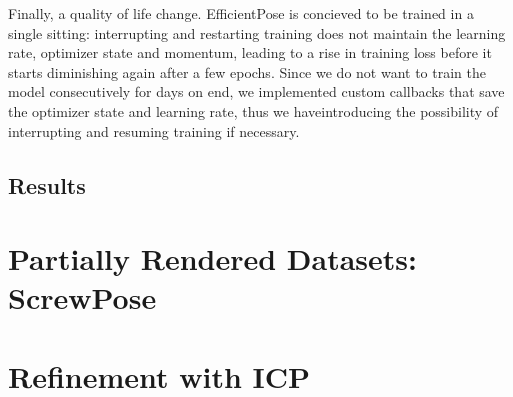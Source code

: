 Finally, a quality of life change. EfficientPose is concieved to be trained in a single sitting: interrupting and restarting training does not maintain the learning rate, optimizer state and momentum, leading to a rise in training loss before it starts diminishing again after a few epochs. Since we do not want to train the model consecutively for days on end, we implemented custom callbacks that save the optimizer state and learning rate, thus we haveintroducing the possibility of interrupting and resuming training if necessary.

\subsection{Results}

\section{Partially Rendered Datasets: ScrewPose}

\section{Refinement with ICP}